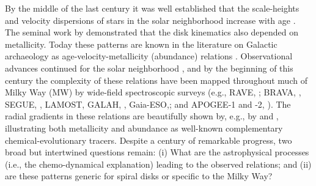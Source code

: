 By the middle of the last century it was well established that the
scale-heights and velocity dispersions of stars in the solar
neighborhood increase with age \citep[see][for a summary of this early
  work, particularly the chapters contributed by Elvius and
  Delhaye]{Blaauw65}. The seminal work by \citet{Roman50} demonstrated
that the disk kinematics also depended on metallicity.  Today these
patterns are known in the literature on Galactic archaeology as
age-velocity-metallicity (abundance) relations \citep[AVM$\alpha$-R;
  e.g.,][]{Aumer09,Minchev14}. Observational advances continued for
the solar neighborhood \citep[e.g.,][]{Edvardsson93, Dehnen98,
  Nordstrom04}, and by the beginning of this century the complexity of
these relations have been mapped throughout much of Milky Way (MW) by
wide-field spectroscopic surveys (e.g., RAVE, \citealt{steinmetz06a};
BRAVA, \citealt{howard08a}, SEGUE, \citealt{yanny09a}, LAMOST,
\citealt{zhao12a} GALAH, \citealt{desilva15a},
Gaia-ESO,\citealt{gilmore12a}; and APOGEE-1 and -2,
\citealt{Majewski15}). The radial gradients in these relations are
beautifully shown by, e.g., by \citet{Bovy12c} and \citet{Hayden15},
illustrating both metallicity and abundance as well-known
complementary chemical-evolutionary tracers. Despite a century of
remarkable progress, two broad but intertwined questions remain: (i)
What are the astrophysical processes (i.e., the chemo-dynamical
explanation) leading to the observed relations; and (ii) are these
patterns generic for spiral disks or specific to the Milky Way?

